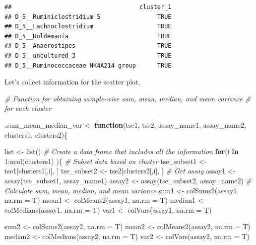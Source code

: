 \documentclass[
]{book}
\newenvironment{Shaded}{\begin{snugshade}}{\end{snugshade}}
\newcommand{\AttributeTok}[1]{\textcolor[rgb]{0.77,0.63,0.00}{#1}}
\newcommand{\CommentTok}[1]{\textcolor[rgb]{0.56,0.35,0.01}{\textit{#1}}}
\newcommand{\ControlFlowTok}[1]{\textcolor[rgb]{0.13,0.29,0.53}{\textbf{#1}}}
\newcommand{\DecValTok}[1]{\textcolor[rgb]{0.00,0.00,0.81}{#1}}
\newcommand{\FunctionTok}[1]{\textcolor[rgb]{0.00,0.00,0.00}{#1}}
\newcommand{\NormalTok}[1]{#1}
\newcommand{\OtherTok}[1]{\textcolor[rgb]{0.56,0.35,0.01}{#1}}
\newcommand{\SpecialCharTok}[1]{\textcolor[rgb]{0.00,0.00,0.00}{#1}}
\begin{document}
\begin{verbatim}
##                                    cluster_1
## D_5__Ruminiclostridium 5                TRUE
## D_5__Lachnoclostridium                  TRUE
## D_5__Holdemania                         TRUE
## D_5__Anaerostipes                       TRUE
## D_5__uncultured_3                       TRUE
## D_5__Ruminococcaceae NK4A214 group      TRUE
\end{verbatim}

Let's collect information for the scatter plot.

\begin{Shaded}
\begin{Highlighting}[]
\CommentTok{\# Function for obtaining sample{-}wise sum, mean, median, and mean variance}
\CommentTok{\# for each cluster}

\NormalTok{.sum\_mean\_median\_var }\OtherTok{\textless{}{-}} \ControlFlowTok{function}\NormalTok{(tse1, tse2, assay\_name1, assay\_name2, clusters1, clusters2)\{}
  
\NormalTok{  list }\OtherTok{\textless{}{-}} \FunctionTok{list}\NormalTok{()}
  \CommentTok{\# Create a data frame that includes all the information}
  \ControlFlowTok{for}\NormalTok{(i }\ControlFlowTok{in} \DecValTok{1}\SpecialCharTok{:}\FunctionTok{ncol}\NormalTok{(clusters1) )\{}
    \CommentTok{\# Subset data based on cluster}
\NormalTok{    tse\_subset1 }\OtherTok{\textless{}{-}}\NormalTok{ tse1[clusters1[,i], ]}
\NormalTok{    tse\_subset2 }\OtherTok{\textless{}{-}}\NormalTok{ tse2[clusters2[,i], ]}
    \CommentTok{\# Get assay}
\NormalTok{    assay1 }\OtherTok{\textless{}{-}} \FunctionTok{assay}\NormalTok{(tse\_subset1, assay\_name1)}
\NormalTok{    assay2 }\OtherTok{\textless{}{-}} \FunctionTok{assay}\NormalTok{(tse\_subset2, assay\_name2)}
    \CommentTok{\# Calculate sum, mean, median, and mean variance}
\NormalTok{    sum1 }\OtherTok{\textless{}{-}} \FunctionTok{colSums2}\NormalTok{(assay1, }\AttributeTok{na.rm =}\NormalTok{ T)}
\NormalTok{    mean1 }\OtherTok{\textless{}{-}} \FunctionTok{colMeans2}\NormalTok{(assay1, }\AttributeTok{na.rm =}\NormalTok{ T)}
\NormalTok{    median1 }\OtherTok{\textless{}{-}} \FunctionTok{colMedians}\NormalTok{(assay1, }\AttributeTok{na.rm =}\NormalTok{ T)}
\NormalTok{    var1 }\OtherTok{\textless{}{-}} \FunctionTok{colVars}\NormalTok{(assay1, }\AttributeTok{na.rm =}\NormalTok{ T)}
    
\NormalTok{    sum2 }\OtherTok{\textless{}{-}} \FunctionTok{colSums2}\NormalTok{(assay2, }\AttributeTok{na.rm =}\NormalTok{ T)}
\NormalTok{    mean2 }\OtherTok{\textless{}{-}} \FunctionTok{colMeans2}\NormalTok{(assay2, }\AttributeTok{na.rm =}\NormalTok{ T)}
\NormalTok{    median2 }\OtherTok{\textless{}{-}} \FunctionTok{colMedians}\NormalTok{(assay2, }\AttributeTok{na.rm =}\NormalTok{ T)}
\NormalTok{    var2 }\OtherTok{\textless{}{-}} \FunctionTok{colVars}\NormalTok{(assay2, }\AttributeTok{na.rm =}\NormalTok{ T)}
    

\end{Highlighting}
\end{Shaded}
\end{document}
